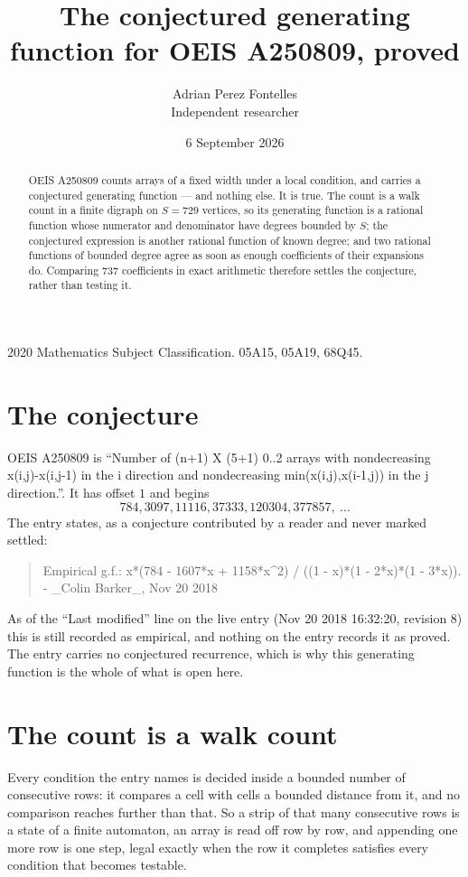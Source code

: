 \documentclass[11pt,a4paper]{article}
\title{The conjectured generating function for OEIS A250809, proved}
\author{Adrian Perez Fontelles\\ \small Independent researcher}
\date{6 September 2026}
\theoremstyle{plain}
\theoremstyle{definition}
\begin{document}
\maketitle

\begin{abstract}
OEIS A250809 counts arrays of a fixed width under a local condition, and carries a conjectured
generating function --- and nothing else. It is true. The count is a walk count in a finite
digraph on $S=729$ vertices, so its generating function is a rational function whose numerator
and denominator have degrees bounded by $S$; the conjectured expression is another rational
function of known degree; and two rational functions of bounded degree agree as soon as enough
coefficients of their expansions do. Comparing $737$ coefficients in exact arithmetic
therefore settles the conjecture, rather than testing it.
\end{abstract}

\noindent\small 2020 Mathematics Subject Classification. 05A15, 05A19, 68Q45.\normalsize

\section{The conjecture}

OEIS A250809 is ``Number of (n+1) X (5+1) 0..2 arrays with nondecreasing x(i,j)-x(i,j-1) in the i direction and nondecreasing min(x(i,j),x(i-1,j)) in the j direction.''. It has offset $1$ and begins
\[
784, 3097, 11116, 37333, 120304, 377857,\ \dots
\]
The entry states, as a conjecture contributed by a reader and never marked settled:
\begin{quote}
Empirical g.f.: x*(784 - 1607*x + 1158*x\^{}2) / ((1 - x)*(1 - 2*x)*(1 - 3*x)). - \_Colin Barker\_, Nov 20 2018
\end{quote}
As of the ``Last modified'' line on the live entry (Nov 20 2018 16:32:20, revision 8) this is still
recorded as empirical, and nothing on the entry records it as proved. The entry carries no
conjectured recurrence, which is why this generating function is the whole of what is open
here.

\section{The count is a walk count}

Every condition the entry names is decided inside a bounded number of consecutive rows: it
compares a cell with cells a bounded distance from it, and no comparison reaches further than
that. So a strip of that many consecutive rows is a state of a finite automaton, an array is
read off row by row, and appending one more row is one step, legal exactly when the row it
completes satisfies every condition that becomes testable.
\end{document}
